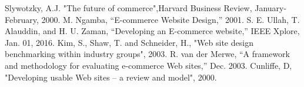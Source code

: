 \documentclass[article]{IEEEtran}
\begin{document}
\begin{thebibliography}{9}
                Slywotzky, A.J. "The future of commerce",Harvard Business Review, January-February, 2000.
                M. Ngamba, “E-commerce Website Design,” 2001.
                S. E. Ullah, T. Alauddin, and H. U. Zaman, “Developing an E-commerce website,” IEEE Xplore, Jan. 01, 2016. 
                Kim, S., Shaw, T. and Schneider, H., "Web site design benchmarking within industry groups", 2003.
                R. van der Merwe, “A framework and methodology for evaluating e-commerce Web sites,” Dec. 2003.
                Cunliffe, D, "Developing usable Web sites – a review and model", 2000.


\end{thebibliography}
\end{document}
